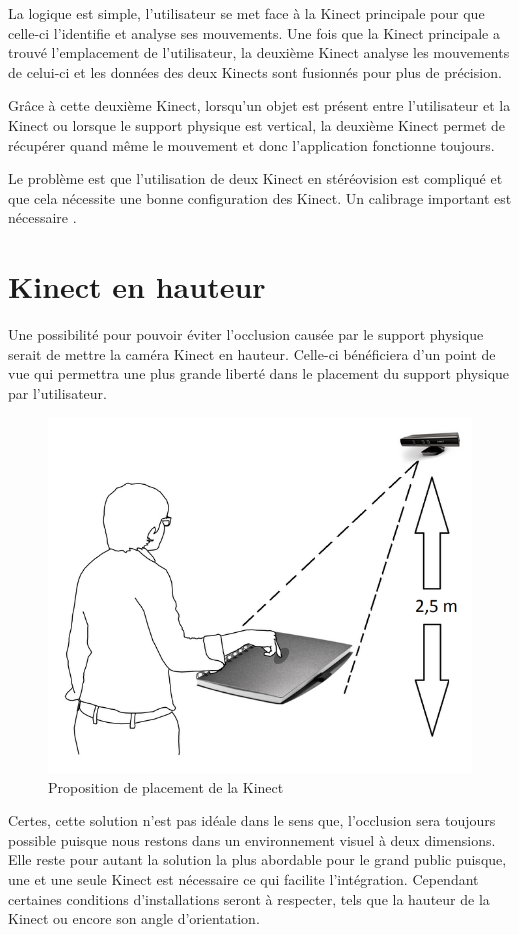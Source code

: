 La logique est simple, l’utilisateur se met face à la Kinect principale pour que celle-ci l’identifie et analyse ses mouvements. Une fois que la Kinect principale a trouvé l’emplacement de l’utilisateur, la deuxième Kinect analyse les mouvements de celui-ci et les données des deux Kinects sont fusionnés pour plus de précision. 

Grâce à cette deuxième Kinect, lorsqu’un objet est présent entre l’utilisateur et la Kinect ou lorsque le support physique est vertical, la deuxième Kinect permet de récupérer quand même le mouvement et donc l’application fonctionne toujours.
	
Le problème est que l’utilisation de deux Kinect en stéréovision est compliqué et que cela nécessite une bonne configuration des Kinect. Un calibrage important est nécessaire .


\section{Kinect en hauteur}

Une possibilité pour pouvoir éviter l’occlusion causée par le support physique serait de mettre la caméra Kinect en hauteur. Celle-ci bénéficiera d’un point de vue qui permettra une plus grande liberté dans le placement du support physique par l’utilisateur.

\begin{figure}[!ht]
	\center	
	\includegraphics[scale=0.25]{image/result.png}
	\caption{Proposition de placement de la Kinect}
\end{figure}

Certes, cette solution n’est pas idéale dans le sens que, l’occlusion sera toujours possible puisque nous restons dans un environnement visuel à deux dimensions. Elle reste pour autant la solution la plus abordable pour le grand public puisque, une et une seule Kinect est nécessaire ce qui facilite l’intégration. Cependant certaines conditions d’installations seront à respecter, tels que la hauteur de la Kinect ou encore son angle d’orientation.
